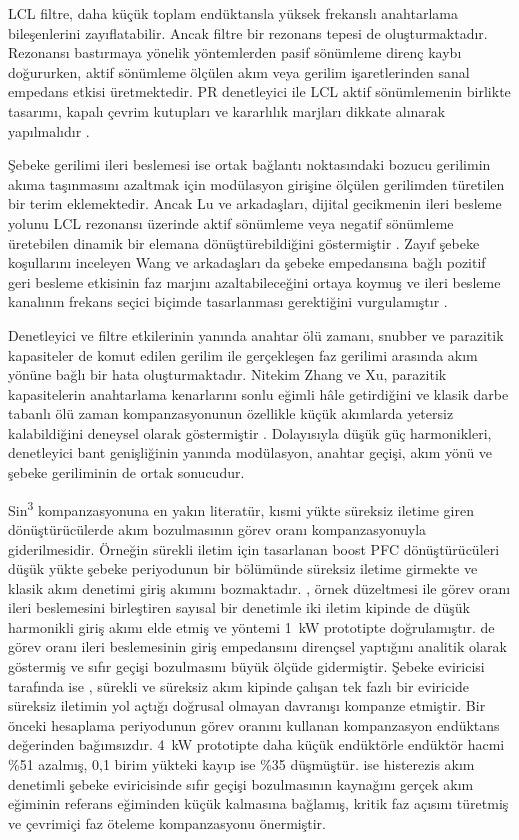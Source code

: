 LCL filtre, daha küçük toplam endüktansla yüksek frekanslı anahtarlama bileşenlerini zayıflatabilir. Ancak filtre bir rezonans tepesi de oluşturmaktadır. Rezonansı bastırmaya yönelik yöntemlerden pasif sönümleme direnç kaybı doğururken, aktif sönümleme ölçülen akım veya gerilim işaretlerinden sanal empedans etkisi üretmektedir. PR denetleyici ile LCL aktif sönümlemenin birlikte tasarımı, kapalı çevrim kutupları ve kararlılık marjları dikkate alınarak yapılmalıdır \citep{Zhang2014PR}.

Şebeke gerilimi ileri beslemesi ise ortak bağlantı noktasındaki bozucu gerilimin akıma taşınmasını azaltmak için modülasyon girişine ölçülen gerilimden türetilen bir terim eklemektedir. Ancak Lu ve arkadaşları, dijital gecikmenin ileri besleme yolunu LCL rezonansı üzerinde aktif sönümleme veya negatif sönümleme üretebilen dinamik bir elemana dönüştürebildiğini göstermiştir \citep{Lu2016}. Zayıf şebeke koşullarını inceleyen Wang ve arkadaşları da şebeke empedansına bağlı pozitif geri besleme etkisinin faz marjını azaltabileceğini ortaya koymuş ve ileri besleme kanalının frekans seçici biçimde tasarlanması gerektiğini vurgulamıştır \citep{Wang2024}.

Denetleyici ve filtre etkilerinin yanında anahtar ölü zamanı, snubber ve parazitik kapasiteler de komut edilen gerilim ile gerçekleşen faz gerilimi arasında akım yönüne bağlı bir hata oluşturmaktadır. Nitekim Zhang ve Xu, parazitik kapasitelerin anahtarlama kenarlarını sonlu eğimli hâle getirdiğini ve klasik darbe tabanlı ölü zaman kompanzasyonunun özellikle küçük akımlarda yetersiz kalabildiğini deneysel olarak göstermiştir \citep{Zhang2014Deadtime}. Dolayısıyla düşük güç harmonikleri, denetleyici bant genişliğinin yanında modülasyon, anahtar geçişi, akım yönü ve şebeke geriliminin de ortak sonucudur.

Sin\textsuperscript{3} kompanzasyonuna en yakın literatür, kısmi yükte süreksiz iletime giren dönüştürücülerde akım bozulmasının görev oranı kompanzasyonuyla giderilmesidir. Örneğin sürekli iletim için tasarlanan boost PFC dönüştürücüleri düşük yükte şebeke periyodunun bir bölümünde süreksiz iletime girmekte ve klasik akım denetimi giriş akımını bozmaktadır. \citet{DeGusseme2005}, örnek düzeltmesi ile görev oranı ileri beslemesini birleştiren sayısal bir denetimle iki iletim kipinde de düşük harmonikli giriş akımı elde etmiş ve yöntemi \SI{1}{\kilo\watt} prototipte doğrulamıştır. \citet{VanDeSype2005} de görev oranı ileri beslemesinin giriş empedansını dirençsel yaptığını analitik olarak göstermiş ve sıfır geçişi bozulmasını büyük ölçüde gidermiştir. Şebeke eviricisi tarafında ise \citet{Le2019}, sürekli ve süreksiz akım kipinde çalışan tek fazlı bir eviricide süreksiz iletimin yol açtığı doğrusal olmayan davranışı kompanze etmiştir. Bir önceki hesaplama periyodunun görev oranını kullanan kompanzasyon endüktans değerinden bağımsızdır. \SI{4}{\kilo\watt} prototipte daha küçük endüktörle endüktör hacmi \%51 azalmış, 0,1 birim yükteki kayıp ise \%35 düşmüştür. \citet{Wu2013} ise histerezis akım denetimli şebeke eviricisinde sıfır geçişi bozulmasının kaynağını gerçek akım eğiminin referans eğiminden küçük kalmasına bağlamış, kritik faz açısını türetmiş ve çevrimiçi faz öteleme kompanzasyonu önermiştir.

